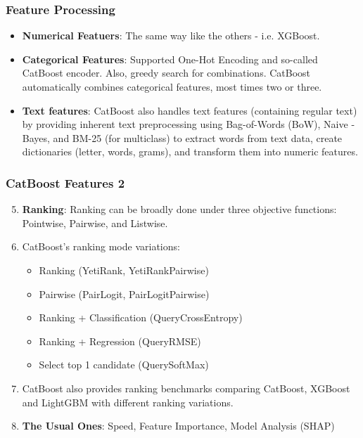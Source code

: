 \documentclass{beamer}
\begin{document}
    \begin{frame}
        \frametitle{Feature Processing}
        \begin{itemize}
            \item \textbf{Numerical Featuers}: The same way like the others - i.e. XGBoost.
            \pause
            \item \textbf{Categorical Features}: Supported One-Hot Encoding and so-called CatBoost
            encoder. Also, greedy search for combinations. CatBoost automatically combines
            categorical features, most times two or three.
            \pause
            \item \textbf{Text features}: CatBoost also handles text features (containing regular
            text) by providing inherent text preprocessing using Bag-of-Words (BoW), Naive
            -Bayes, and BM-25 (for multiclass) to extract words from text data, create
            dictionaries (letter, words, grams), and transform them into numeric features.
        \end{itemize}
    \end{frame}

    \begin{frame}
        \frametitle{CatBoost Features 2}
        \begin{enumerate}
            \setcounter{enumi}{4}
            \item \textbf{Ranking}: Ranking can be broadly done under three objective functions:
            Pointwise, Pairwise, and Listwise.
            \pause
            \item CatBoost's ranking mode variations:
            \begin{itemize}
                \item Ranking (YetiRank, YetiRankPairwise)
                \item Pairwise (PairLogit, PairLogitPairwise)
                \item Ranking + Classification (QueryCrossEntropy)
                \item Ranking + Regression (QueryRMSE)
                \item Select top 1 candidate (QuerySoftMax)
            \end{itemize}
            \pause
            \item CatBoost also provides ranking benchmarks comparing CatBoost, XGBoost and
            LightGBM with different ranking variations.
            \pause
            \item \textbf{The Usual Ones}: Speed, Feature Importance, Model Analysis (SHAP)
        \end{enumerate}
    \end{frame}
\end{document}
